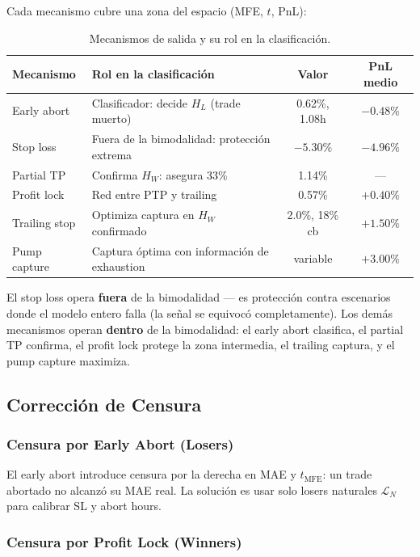 \documentclass[11pt,a4paper]{article}
\begin{document}
Cada mecanismo cubre una zona del espacio (MFE, $t$, PnL):

\begin{table}[H]
\centering
\caption{Mecanismos de salida y su rol en la clasificaci\'on.}
\label{tab:exit_zones}
\begin{tabularx}{\textwidth}{lXcc}
\toprule
\textbf{Mecanismo} & \textbf{Rol en la clasificaci\'on} & \textbf{Valor} & \textbf{PnL medio} \\
\midrule
Early abort & Clasificador: decide $H_L$ (trade muerto) & 0.62\%, 1.08h & $-0.48\%$ \\
Stop loss & Fuera de la bimodalidad: protecci\'on extrema & $-5.30\%$ & $-4.96\%$ \\
Partial TP & Confirma $H_W$: asegura 33\% & 1.14\% & --- \\
Profit lock & Red entre PTP y trailing & 0.57\% & $+0.40\%$ \\
Trailing stop & Optimiza captura en $H_W$ confirmado & 2.0\%, 18\% cb & $+1.50\%$ \\
Pump capture & Captura \'optima con informaci\'on de exhaustion & variable & $+3.00\%$ \\
\bottomrule
\end{tabularx}
\end{table}

El stop loss opera \textbf{fuera} de la bimodalidad --- es protecci\'on
contra escenarios donde el modelo entero falla (la se\~nal se equivoc\'o
completamente). Los dem\'as mecanismos operan \textbf{dentro} de la
bimodalidad: el early abort clasifica, el partial TP confirma, el
profit lock protege la zona intermedia, el trailing captura, y el
pump capture maximiza.


\subsection{Correcci\'on de Censura}

\subsubsection{Censura por Early Abort (Losers)}

El early abort introduce censura por la derecha
\cite{kaplan1958nonparametric} en MAE y $t_{\text{MFE}}$: un trade
abortado no alcanz\'o su MAE real. La soluci\'on es usar solo losers
naturales $\mathcal{L}_N$ para calibrar SL y abort hours.

\subsubsection{Censura por Profit Lock (Winners)}
\end{document}

